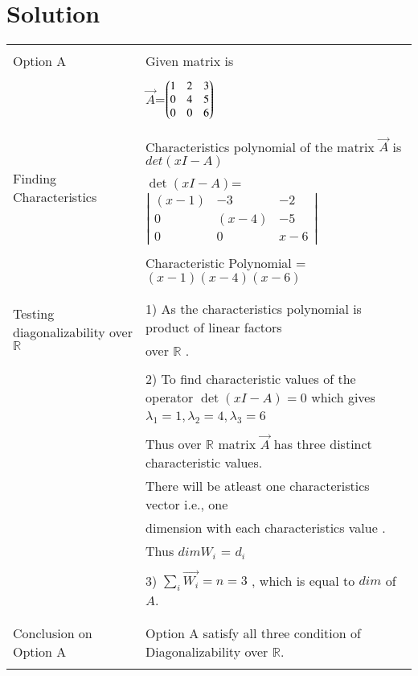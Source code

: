 \documentclass[journal,12pt]{IEEEtran}
\begin{document}
\section{\textbf{Solution}}
\renewcommand{\thetable}{2}
\begin{longtable}{|l|l|}
\hline
\multirow{3}{*}{Option A} & \\
& Given matrix is  \\
&\\
& $\vec{A}$=$\begin{pmatrix}1&2&3\\0&4&5\\0&0&6\end{pmatrix}$\\
&\\
\hline
\multirow{3}{*}{Finding Characteristics} & \\
&
Characteristics polynomial of the matrix $\vec{A}$ is $det(xI-A)$\\ 
polynomial
& $\det(xI-A)$= $\left|
                \begin{array}{ccc}
                (x-1) & -3 & -2\\
                0 & (x-4) & -5\\
                0 & 0 & x-6
                \end{array} \right|$  \\
&\\
& Characteristic Polynomial = $(x-1)(x-4)(x-6)$\\
&\\
\hline
\multirow{3}{*}{Testing diagonalizability over $\mathbb{R}$} & \\
& 1) As the characteristics  polynomial is product of linear factors\\
&over $\mathbb{R}$ .\\
&\\
&2) To find characteristic values of the operator $\det(xI-A) = 0$ which gives  \\
& $\lambda_1= 1 , \lambda_2= 4, \lambda_3= 6$\\
&\\
& Thus over $\mathbb{R}$ matrix $\vec{A}$ has three distinct characteristic values.\\
&There will be atleast one characteristics vector i.e., one\\ & dimension with each characteristics value .\\
&Thus $dim W_i$ = $d_i$\\
&\\
&3) $\sum_{i} \vec{W_i} = n = 3$ , which is equal to $dim$ of $A$.\\ 
&\\
\hline
\multirow{3}{*}{Conclusion on Option A} & \\
& Option A satisfy all three condition of Diagonalizability over $\mathbb{R}$. \\
&\\


\end{longtable}
\end{document}
